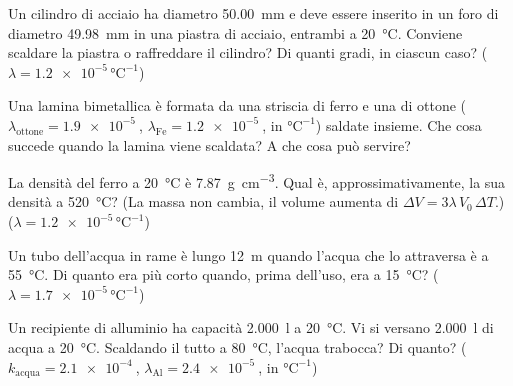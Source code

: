 \begin{esercizio}
Un cilindro di acciaio ha diametro \SI{50,00}{\milli\metre} e deve essere inserito in un foro di diametro \SI{49,98}{\milli\metre} in una piastra di acciaio, entrambi a \SI{20}{\celsius}. Conviene scaldare la piastra o raffreddare il cilindro? Di quanti gradi, in ciascun caso? ($\lambda = \num{1,2e-5}\,\si{\celsius}^{-1}$)\\
\end{esercizio}

\begin{esercizio}
Una lamina bimetallica è formata da una striscia di ferro e una di ottone ($\lambda_{\text{ottone}} = \SI{1,9e-5}{}$, $\lambda_{\text{Fe}} = \SI{1,2e-5}{}$, in $\si{\celsius}^{-1}$) saldate insieme. Che cosa succede quando la lamina viene scaldata? A che cosa può servire?\\
\end{esercizio}

\begin{esercizio}
La densità del ferro a \SI{20}{\celsius} è \SI{7,87}{\gram\per\centi\metre\cubed}. Qual è, approssimativamente, la sua densità a \SI{520}{\celsius}? (La massa non cambia, il volume aumenta di $\Delta V = 3\lambda\,V_0\,\Delta T$.) ($\lambda = \num{1,2e-5}\,\si{\celsius}^{-1}$)\\
\end{esercizio}

\begin{esercizio}
Un tubo dell'acqua in rame è lungo \SI{12}{\metre} quando l'acqua che lo attraversa è a \SI{55}{\celsius}. Di quanto era più corto quando, prima dell'uso, era a \SI{15}{\celsius}? ($\lambda = \num{1,7e-5}\,\si{\celsius}^{-1}$)\\
\end{esercizio}

\begin{esercizio}
Un recipiente di alluminio ha capacità \SI{2,000}{\litre} a \SI{20}{\celsius}. Vi si versano \SI{2,000}{\litre} di acqua a \SI{20}{\celsius}. Scaldando il tutto a \SI{80}{\celsius}, l'acqua trabocca? Di quanto? ($k_{\text{acqua}} = \SI{2,1e-4}{}$, $\lambda_{\text{Al}} = \SI{2,4e-5}{}$, in $\si{\celsius}^{-1}$)\\
\end{esercizio}

